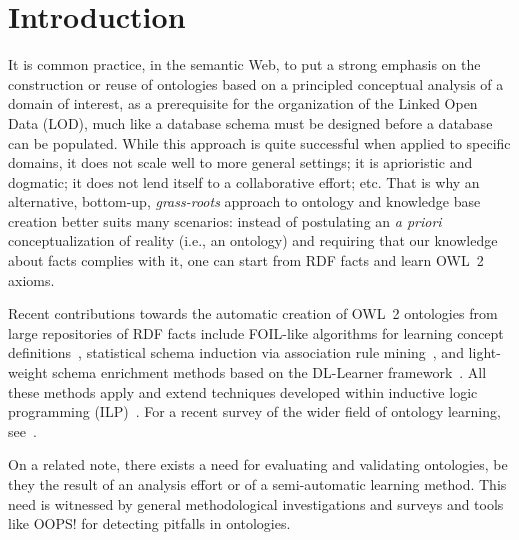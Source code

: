 \documentclass{sig-alternate}
\begin{document}

\section{Introduction}

It is common practice, in the semantic Web, to put a strong emphasis
on the construction or reuse of ontologies based on a principled conceptual analysis
of a domain of interest, as a prerequisite for the organization of the Linked Open Data (LOD),
much like a database schema must be designed before a database can be populated.
While this approach is quite successful when applied to specific domains,
it does not scale well to more general settings;
it is aprioristic and dogmatic;
it does not lend itself to a collaborative effort; etc.
That is why an alternative, bottom-up, \emph{grass-roots} approach to ontology and
knowledge base creation better suits many scenarios: instead of postulating an \emph{a priori}
conceptualization of reality (i.e., an ontology) and requiring that our knowledge
about facts complies with it, one can start from RDF facts and learn OWL~2 axioms.

Recent contributions towards the automatic creation of OWL~2 ontologies
from large repositories of RDF facts include
FOIL-like algorithms for learning concept definitions~\cite{FanizziDAmatoEsposito2008},
statistical schema induction via association rule mining~\cite{FleischhackerVoelkerStuckenschmidt2012},
and light-weight schema enrichment methods based on the DL-Learner
framework~\cite{HellmannLehmannAuer2009,BuehmannLehmann2012}.
All these methods apply and extend techniques developed within inductive logic programming
(ILP)~\cite{ILPat20}. For a recent survey of the wider field of ontology learning,
see~\cite{LehmannVoelker2014}.

On a related note, there exists a need for evaluating and validating ontologies,
be they the result of an analysis effort or of a semi-automatic learning method.
This need is witnessed by general methodological investigations
\cite{GangemiCatenacciCiaramitaLehmann2005,GangemiCatenacciCiaramitaLehmann2006}
and surveys \cite{TartirBudakArpinarSheth2007} and tools like OOPS! \cite{PovedaSuarezGomez2012}
for detecting pitfalls in ontologies.
\end{document}
